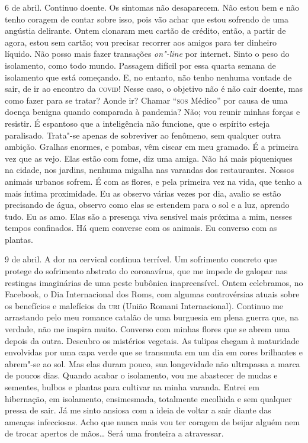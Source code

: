 6 de abril. Continuo doente. Os sintomas não desaparecem. Não estou bem
e não tenho coragem de contar sobre isso, pois vão achar que estou
sofrendo de uma angústia delirante. Ontem clonaram meu cartão de
crédito, então, a partir de agora, estou sem cartão; vou precisar
recorrer aos amigos para ter dinheiro líquido. Não posso mais fazer
transações \emph{on"-line} por internet. Sinto o peso do isolamento, como
todo mundo. Passagem difícil por essa quarta semana de isolamento que
está começando. E, no entanto, não tenho nenhuma vontade de sair, de ir
ao encontro da \textsc{covid}! Nesse caso, o objetivo não é não cair doente, mas
como fazer para se tratar? Aonde ir? Chamar ``\textsc{sos} Médico'' por causa de
uma doença benigna quando comparada à pandemia? Não; vou reunir minhas
forças e resistir. É espantoso que a inteligência não funcione, que o
espírito esteja paralisado. Trata"-se apenas de sobreviver ao fenômeno,
sem qualquer outra ambição. Gralhas enormes, e pombas, vêm ciscar em meu
gramado. É a primeira vez que as vejo. Elas estão com fome, diz uma
amiga. Não há mais piqueniques na cidade, nos jardins, nenhuma migalha
nas varandas dos restaurantes. Nossos animais urbanos sofrem. É com as
flores, e pela primeira vez na vida, que tenho a mais íntima
proximidade. Eu as observo várias vezes por dia, avalio se estão
precisando de água, observo como elas se estendem para o sol e a luz,
aprendo tudo. Eu as amo. Elas são a presença viva sensível mais próxima
a mim, nesses tempos confinados. Há quem converse com os animais. Eu
converso com as plantas.

9 de abril. A dor na cervical continua terrível. Um sofrimento concreto
que protege do sofrimento abstrato do coronavírus, que me impede de
galopar nas restingas imaginárias de uma peste bubônica inapreensível.
Ontem celebramos, no Facebook, o Dia Internacional dos Roms, com algumas
controvérsias atuais sobre os benefícios e malefícios da \textsc{uri} (União
Romani Internacional). Continuo me arrastando pelo meu romance catalão
de uma burguesia em plena guerra que, na verdade, não me inspira muito.
Converso com minhas flores que se abrem uma depois da outra. Descubro os
mistérios vegetais. As tulipas chegam à maturidade envolvidas por uma
capa verde que se transmuta em um dia em cores brilhantes e abrem"-se ao
sol. Mas elas duram pouco, sua longevidade não ultrapassa a marca de
poucos dias. Quando acabar o isolamento, vou me abastecer de mudas e
sementes, bulbos e plantas para cultivar na minha varanda. Entrei em
hibernação, em isolamento, ensimesmada, totalmente encolhida e sem
qualquer pressa de sair. Já me sinto ansiosa com a ideia de voltar a
sair diante das ameaças infecciosas. Acho que nunca mais vou ter coragem
de beijar alguém nem de trocar apertos de mãos\ldots{} Será uma fronteira a
atravessar.

